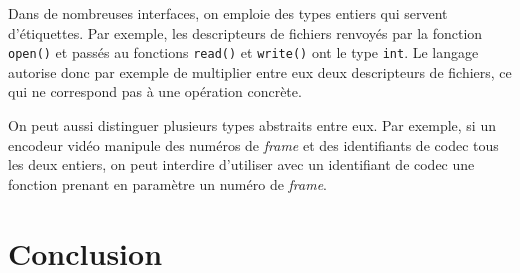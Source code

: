 Dans de nombreuses interfaces, on emploie des types entiers qui servent
d'étiquettes. Par exemple, les descripteurs de fichiers renvoyés par la fonction
\texttt{open()} et passés au fonctions \texttt{read()} et \texttt{write()} ont
le type \texttt{int}. Le langage autorise donc par exemple de multiplier entre
eux deux descripteurs de fichiers, ce qui ne correspond pas à une opération
concrète.

On peut aussi distinguer plusieurs types abstraits entre eux. Par exemple, si un
encodeur vidéo manipule des numéros de \emph{frame} et des identifiants de codec
tous les deux entiers, on peut interdire d'utiliser avec un identifiant de codec
une fonction prenant en paramètre un numéro de \emph{frame}.

\section{Conclusion}

